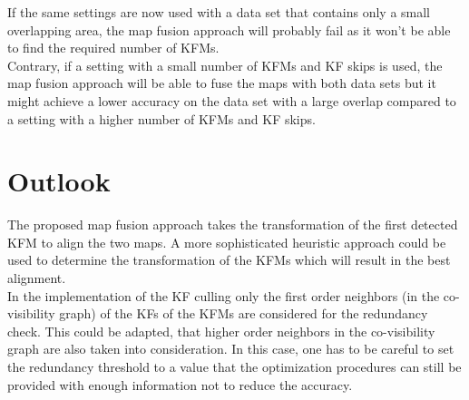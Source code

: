 If the same settings are now used with a data set that contains only a small overlapping area, the map fusion approach will probably fail as it won't be able to find the required number of \acp{KFM}.\\

Contrary, if a setting with a small number of \acp{KFM} and \ac{KF} skips is used, the map fusion approach will be able to fuse the maps with both data sets but it might achieve a lower accuracy on the data set with a large overlap compared to a setting with a higher number of \acp{KFM} and \ac{KF} skips.

\section{Outlook}

The proposed map fusion approach takes the transformation of the first detected \ac{KFM} to align the two maps. A more sophisticated heuristic approach could be used to determine the transformation of the \acp{KFM} which will result in the best alignment.\\

In the implementation of the \ac{KF} culling only the first order neighbors (in the co-visibility graph) of the \acp{KF} of the \acp{KFM} are considered for the redundancy check. This could be adapted, that higher order neighbors in the co-visibility graph are also taken into consideration. In this case, one has to be careful to set the redundancy threshold to a value that the optimization procedures can still be provided with enough information not to reduce the accuracy.
